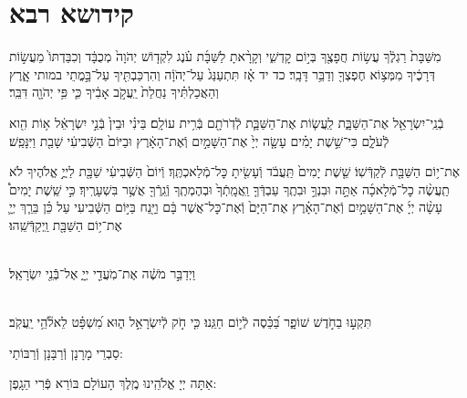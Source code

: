 \documentclass[twoside, openany, parskip=half, 11pt]{book}
\begin{document}
%


%
%
%
\chapter[קידושא רבא]{ קידושא רבא }

 מִשַּׁבָּת֙ רַגְלֶ֔ךָ עֲשׂ֥וֹת חֲפָצֶ֖ךָ בְּי֣וֹם קׇדְשִׁ֑י וְקָרָ֨אתָ לַשַּׁבָּ֜ת עֹ֗נֶג לִקְד֤וֹשׁ יְהֹוָה֙ מְכֻבָּ֔ד וְכִבַּדְתּוֹ֙ מֵעֲשׂ֣וֹת דְּרָכֶ֔יךָ מִמְּצ֥וֹא חֶפְצְךָ֖ וְדַבֵּ֥ר דָּבָֽר׃ כד יד אָ֗ז תִּתְעַנַּג֙ עַל־יְהֹוָ֔ה וְהִרְכַּבְתִּ֖יךָ עַל־בָּ֣מֳתֵי במותי אָ֑רֶץ וְהַאֲכַלְתִּ֗יךָ נַחֲלַת֙ יַֽעֲקֹ֣ב אָבִ֔יךָ כִּ֛י פִּ֥י יְהֹוָ֖ה דִּבֵּֽר׃ 

 בְֿנֵֽי־יִשְׂרָאֵ֖ל אֶת־הַשַּׁבָּ֑ת לַֽעֲשׂ֧וֹת אֶת־הַשַּׁבָּ֛ת לְֿדֹֽרֹתָ֖ם בְּֿרִ֥ית עוֹלָֽם׃ בֵּינִ֗י וּבֵין֙ בְּֿנֵ֣י יִשְׂרָאֵ֔ל א֥וֹת הִ֖וא לְֿעֹלָ֑ם כִּי־שֵׁ֣שֶׁת יָמִ֗ים עָשָׂ֤ה יְיָ֙ אֶת־הַשָּׁמַ֣יִם וְֿאֶת־הָאָ֔רֶץ וּבַיּוֹם֙ הַשְּֿׁבִיעִ֔י שָׁבַ֖ת וַיִּנָּפַֽשׁ׃


 אֶת־י֥וֹם הַשַּׁבָּ֖ת לְֿקַדְּֿשֽׁוֹ׃ שֵׁ֤שֶׁת יָמִים֙ תַּֽעֲבֹ֔ד וְֿעָשִׂ֖יתָ כׇּל־מְֿלַאכְתֶּֽךָ׃ וְֿיוֹם֙ הַשְּֿׁבִיעִ֔י שַׁבָּ֖ת לַיֽיֳ֣ אֱלֹהֶיךָ לֹא תַֽעֲשֶׂ֨ה כׇל־מְֿלָאכָ֜ה אַתָּ֣ה וּבִנְךָ֣ וּבִתֶֽךָ עַבְדְּֿךָ֤ וַֽאֲמָֽתְֿךָ֙ וּבְהֶמְתֶֽךָ וְֿגֵֽרְֿךָ֖ אֲשֶׁ֥ר בִּשְׁעָרֶֽיךָ׃ כִּ֣י שֵֽׁשֶׁת יָמִים֩ עָשָׂ֨ה יְיָ֜ אֶת־הַשָּׁמַ֣יִם וְֿאֶת־הָאָ֗רֶץ אֶת־הַיָּם֙ וְֿאֶת־כׇּל־אֲשֶׁר בָּ֔ם וַיָּ֖נַח בַּיּ֣וֹם הַשְּֿׁבִיעִי עַל כֵּ֗ן בֵּרַ֧ךְ יְיָ֛ אֶת־י֥וֹם הַשַּׁבָּ֖ת וַֽיְקַדְּֿשֵֽׁהוּ׃

\begin{sometimes}

\\
וַיְדַבֵּ֣ר מֹשֶׁ֔ה אֶת־מֹֽעֲדֵ֖י יְיָ֑ אֶל־בְּֿֿנֵ֖י יִשְׂרָאֵֽל׃

\sepline

\\
תִּקְע֣וּ בַחֹ֣דֶשׁ שׁוֹפָ֑ר בַּ֝כֵּ֗סֶה לְֿי֣וֹם חַגֵּֽנוּ׃ כִּ֤י חֹ֣ק לְֿיִשְׂרָאֵ֣ל ה֑וּא מִ֝שְׁפָּ֗ט לֵאלֹ֘הֵ֥י יַֽעֲקֹֽב׃

\end{sometimes}

\vspace{-.5\baselineskip}

\begin{scriptsize}
סַבְרֵי מָרָנָן וְֿרַבָּנָן וְֿרַבּוֹתַי: \\
\end{scriptsize}
 אַתָּה יְיָ אֱלֹהֵֽינוּ מֶֽלֶךְ הָעוֹלָם בּוֹרֵא פְּֿרִי הַגָֽפֶן:
\end{document}
